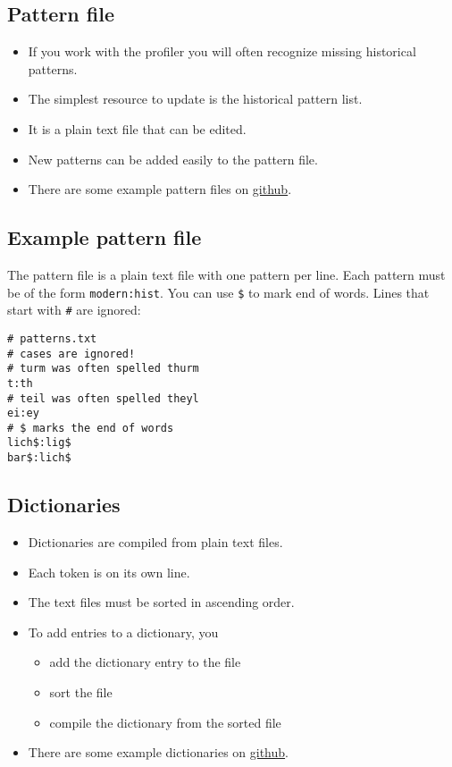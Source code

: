 \subsection{Pattern file}
\begin{frame}
	\begin{itemize}
		\item If you work with the profiler you will often recognize missing
			historical patterns.
		\item The simplest resource to update is the historical pattern list.
		\item It is a plain text file that can be edited.
		\item New patterns can be added easily to the pattern file.
		\item There are some example pattern files on
			\href{https://github.com/cisocrgroup/Resources/tree/master/lexica}{github}.
	\end{itemize}
\end{frame}

\subsection{Example pattern file}
\begin{frame}[fragile]
	The pattern file is a plain text file with one pattern per line. Each pattern
	must be of the form \texttt{modern:hist}. You can use \texttt{\$} to mark end
	of words. Lines that start with \texttt{\#} are ignored:

\begin{verbatim}
# patterns.txt
# cases are ignored!
# turm was often spelled thurm
t:th
# teil was often spelled theyl
ei:ey
# $ marks the end of words
lich$:lig$
bar$:lich$
\end{verbatim}
\end{frame}

\subsection{Dictionaries}
\begin{frame}
	\begin{itemize}
		\item Dictionaries are compiled from plain text files.
		\item Each token is on its own line.
		\item The text files must be sorted in ascending order.
		\item To add entries to a dictionary, you
			\begin{itemize}
				\item add the dictionary entry to the file
				\item sort the file
				\item compile the dictionary from the sorted file
			\end{itemize}
		\item There are some example dictionaries on
			\href{https://github.com/cisocrgroup/Resources/tree/master/lexica}{github}.
	\end{itemize}
\end{frame}

